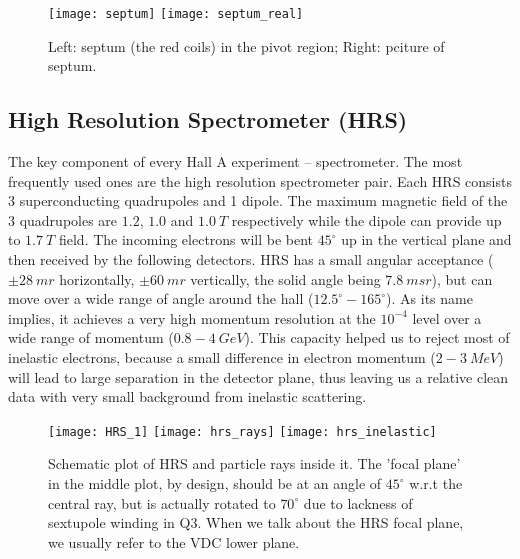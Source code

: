 \begin{figure}[h!]
    \texttt{[image: septum]}
    \texttt{[image: septum\_real]}
    \caption{Left: septum (the red coils) in the pivot region; 
    Right: pciture of septum.}
\end{figure}

\subsection{High Resolution Spectrometer (HRS)}
The key component of every Hall A experiment -- spectrometer. The most frequently
used ones are the high resolution spectrometer pair. Each HRS consists 3 superconducting
quadrupoles and 1 dipole. The maximum magnetic field of the 3 quadrupoles are
$1.2$, $1.0$ and $1.0\ T$ respectively while the dipole can provide up to $1.7\ T$ field. 
The incoming electrons will be bent $45^\circ$ up in the vertical plane and then
received by the following detectors.
HRS has a small angular acceptance ($\pm 28\ mr$ horizontally, $\pm 60\ mr$ vertically, 
the solid angle being $7.8\ msr$), but can move over a wide range of angle
around the hall ($12.5^\circ - 165^\circ$). As its name implies, it achieves a 
very high momentum resolution at the $10^{-4}$ level over a wide range of momentum 
($0.8 - 4\ GeV$). This capacity helped us to reject most of inelastic electrons, 
because a small difference in electron momentum ($2-3\ MeV$) will lead to
large separation in the detector plane, thus leaving us a relative clean data 
with very small background from inelastic scattering. 

\begin{figure}[h!]
    \centering
    \texttt{[image: HRS\_1]}
    \texttt{[image: hrs\_rays]}
    \texttt{[image: hrs\_inelastic]}
    \caption{Schematic plot of HRS and particle rays inside it. \cite{halla3d}
    The 'focal plane' in the middle plot, by design, should be at an angle of $45^\circ$
    w.r.t the central ray, but is actually rotated to $70^\circ$ due to lackness
    of sextupole winding in Q3. When we talk about the HRS focal plane, we
    usually refer to the VDC lower plane.
    }
\end{figure}


